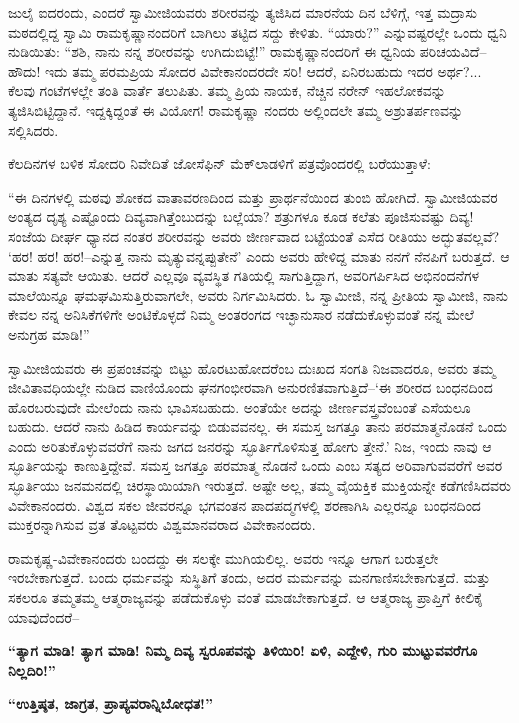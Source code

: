 ಜುಲೈ ಐದರಂದು, ಎಂದರೆ ಸ್ವಾಮೀಜಿಯವರು ಶರೀರವನ್ನು ತ್ಯಜಿಸಿದ ಮಾರನೆಯ ದಿನ ಬೆಳಿಗ್ಗೆ, ಇತ್ತ ಮದ್ರಾಸು ಮಠದಲ್ಲಿದ್ದ ಸ್ವಾಮಿ ರಾಮಕೃಷ್ಣಾನಂದರಿಗೆ ಬಾಗಿಲು ತಟ್ಟಿದ ಸದ್ದು ಕೇಳಿತು. “ಯಾರು?” ಎನ್ನುವಷ್ಟರಲ್ಲೇ ಒಂದು ಧ್ವನಿ ನುಡಿಯಿತು: “ಶಶಿ, ನಾನು ನನ್ನ ಶರೀರವನ್ನು ಉಗಿದುಬಿಟ್ಟೆ!” ರಾಮಕೃಷ್ಣಾನಂದರಿಗೆ ಈ ಧ್ವನಿಯ ಪರಿಚಯವಿದೆ–ಹೌದು! ಇದು ತಮ್ಮ ಪರಮಪ್ರಿಯ ಸೋದರ ವಿವೇಕಾನಂದರದೇ ಸರಿ! ಆದರೆ, ಏನಿರಬಹುದು ಇದರ ಅರ್ಥ?... ಕೆಲವು ಗಂಟೆಗಳಲ್ಲೇ ತಂತಿ ವಾರ್ತೆ ತಲುಪಿತು. ತಮ್ಮ ಪ್ರಿಯ ನಾಯಕ, ನೆಚ್ಚಿನ ನರೇನ್ ಇಹಲೋಕವನ್ನು ತ್ಯಜಿಸಿಬಿಟ್ಟಿದ್ದಾನೆ. ಇದ್ದಕ್ಕಿದ್ದಂತೆ ಈ ವಿಯೋಗ! ರಾಮಕೃಷ್ಣಾ ನಂದರು ಅಲ್ಲಿಂದಲೇ ತಮ್ಮ ಅಶ್ರುತರ್ಪಣವನ್ನು ಸಲ್ಲಿಸಿದರು.

ಕೆಲದಿನಗಳ ಬಳಿಕ ಸೋದರಿ ನಿವೇದಿತೆ ಜೋಸೆಫಿನ್ ಮೆಕ್​ಲಾಡಳಿಗೆ ಪತ್ರವೊಂದರಲ್ಲಿ ಬರೆಯುತ್ತಾಳೆ:

“ಈ ದಿನಗಳಲ್ಲಿ ಮಠವು ಶೋಕದ ವಾತಾವರಣದಿಂದ ಮತ್ತು ಪ್ರಾರ್ಥನೆಯಿಂದ ತುಂಬಿ ಹೋಗಿದೆ. ಸ್ವಾಮೀಜಿಯವರ ಅಂತ್ಯದ ದೃಶ್ಯ ಎಷ್ಟೊಂದು ದಿವ್ಯವಾಗಿತ್ತೆಂಬುದನ್ನು ಬಲ್ಲೆಯಾ? ಶತ್ರುಗಳೂ ಕೂಡ ಕಲೆತು ಪೂಜಿಸುವಷ್ಟು ದಿವ್ಯ! ಸಂಜೆಯ ದೀರ್ಘ ಧ್ಯಾನದ ನಂತರ ಶರೀರವನ್ನು ಅವರು ಜೀರ್ಣವಾದ ಬಟ್ಟೆಯಂತೆ ಎಸೆದ ರೀತಿಯು ಅದ್ಭುತವಲ್ಲವೆ? ‘ಹರ! ಹರ! ಹರ!–ಎನ್ನುತ್ತ ನಾನು ಮೃತ್ಯುವನ್ನಪ್ಪುತೇನೆ’ ಎಂದು ಅವರು ಹೇಳಿದ್ದ ಮಾತು ನನಗೆ ನೆನಪಿಗೆ ಬರುತ್ತದೆ. ಆ ಮಾತು ಸತ್ಯವೇ ಆಯಿತು. ಆದರೆ ಎಲ್ಲವೂ ವ್ಯವಸ್ಥಿತ ಗತಿಯಲ್ಲಿ ಸಾಗುತ್ತಿದ್ದಾಗ, ಅವರಿಗರ್ಪಿಸಿದ ಅಭಿನಂದನೆಗಳ ಮಾಲೆಯಿನ್ನೂ ಘಮಘಮಿಸುತ್ತಿರುವಾಗಲೇ, ಅವರು ನಿರ್ಗಮಿಸಿದರು. ಓ ಸ್ವಾಮೀಜಿ, ನನ್ನ ಪ್ರೀತಿಯ ಸ್ವಾಮೀಜಿ, ನಾನು ಕೇವಲ ನನ್ನ ಅನಿಸಿಕೆಗಳಿಗೇ ಅಂಟಿಕೊಳ್ಳದೆ ನಿಮ್ಮ ಅಂತರಂಗದ ಇಚ್ಛಾನುಸಾರ ನಡೆದುಕೊಳ್ಳುವಂತೆ ನನ್ನ ಮೇಲೆ ಅನುಗ್ರಹ ಮಾಡಿ!”

ಸ್ವಾಮೀಜಿಯವರು ಈ ಪ್ರಪಂಚವನ್ನು ಬಿಟ್ಟು ಹೊರಟುಹೋದರೆಂಬ ದುಃಖದ ಸಂಗತಿ ನಿಜವಾದರೂ, ಅವರು ತಮ್ಮ ಜೀವಿತಾವಧಿಯಲ್ಲೇ ನುಡಿದ ವಾಣಿಯೊಂದು ಘನಗಂಭೀರವಾಗಿ ಅನುರಣಿತವಾಗುತ್ತಿದೆ–‘ಈ ಶರೀರದ ಬಂಧನದಿಂದ ಹೊರಬರುವುದೇ ಮೇಲೆಂದು ನಾನು ಭಾವಿಸಬಹುದು. ಅಂತೆಯೇ ಅದನ್ನು ಜೀರ್ಣವಸ್ತ್ರವೆಂಬಂತೆ ಎಸೆಯಲೂ ಬಹುದು. ಆದರೆ ನಾನು ಹಿಡಿದ ಕಾರ್ಯವನ್ನು ಬಿಡುವವನಲ್ಲ. ಈ ಸಮಸ್ತ ಜಗತ್ತೂ ತಾನು ಪರಮಾತ್ಮನೊಡನೆ ಒಂದು ಎಂದು ಅರಿತುಕೊಳ್ಳುವವರೆಗೆ ನಾನು ಜಗದ ಜನರನ್ನು ಸ್ಫೂರ್ತಿಗೊಳಿಸುತ್ತ ಹೋಗು ತ್ತೇನೆ.’ ನಿಜ, ಇಂದು ನಾವು ಆ ಸ್ಫೂರ್ತಿಯನ್ನು ಕಾಣುತ್ತಿದ್ದೇವೆ. ಸಮಸ್ತ ಜಗತ್ತೂ ಪರಮಾತ್ಮ ನೊಡನೆ ಒಂದು ಎಂಬ ಸತ್ಯದ ಅರಿವಾಗುವವರೆಗೆ ಅವರ ಸ್ಫೂರ್ತಿಯು ಜನಮನದಲ್ಲಿ ಚಿರಸ್ಥಾಯಿಯಾಗಿ ಇರುತ್ತದೆ. ಅಷ್ಟೇ ಅಲ್ಲ, ತಮ್ಮ ವೈಯಕ್ತಿಕ ಮುಕ್ತಿಯನ್ನೇ ಕಡೆಗಣಿಸಿದವರು ವಿವೇಕಾನಂದರು. ವಿಶ್ವದ ಸಕಲ ಜೀವರನ್ನೂ ಭಗವಂತನ ಪಾದಪದ್ಮಗಳಲ್ಲಿ ಶರಣಾಗಿಸಿ ಎಲ್ಲರನ್ನೂ ಬಂಧನದಿಂದ ಮುಕ್ತರನ್ನಾಗಿಸುವ ವ್ರತ ತೊಟ್ಟವರು ವಿಶ್ವಮಾನವರಾದ ವಿವೇಕಾನಂದರು.

ರಾಮಕೃಷ್ಣ-ವಿವೇಕಾನಂದರು ಬಂದದ್ದು ಈ ಸಲಕ್ಕೇ ಮುಗಿಯಲಿಲ್ಲ. ಅವರು ಇನ್ನೂ ಆಗಾಗ ಬರುತ್ತಲೇ ಇರಬೇಕಾಗುತ್ತದೆ. ಬಂದು ಧರ್ಮವನ್ನು ಸುಸ್ಥಿತಿಗೆ ತಂದು, ಅದರ ಮರ್ಮವನ್ನು ಮನಗಾಣಿಸಬೇಕಾಗುತ್ತದೆ. ಮತ್ತು ಸಕಲರೂ ತಮ್ಮತಮ್ಮ ಆತ್ಮರಾಜ್ಯವನ್ನು ಪಡೆದುಕೊಳ್ಳು ವಂತೆ ಮಾಡಬೇಕಾಗುತ್ತದೆ. ಆ ಆತ್ಮರಾಜ್ಯ ಪ್ರಾಪ್ತಿಗೆ ಕೀಲಿಕೈ ಯಾವುದೆಂದರೆ–

\textbf{“ತ್ಯಾಗ ಮಾಡಿ! ತ್ಯಾಗ ಮಾಡಿ! ನಿಮ್ಮ ದಿವ್ಯ ಸ್ವರೂಪವನ್ನು ತಿಳಿಯಿರಿ! ಏಳಿ, ಎದ್ದೇಳಿ, ಗುರಿ ಮುಟ್ಟುವವರೆಗೂ ನಿಲ್ಲದಿರಿ!”}

\textbf{“ಉತ್ತಿಷ್ಠತ, ಜಾಗ್ರತ, ಪ್ರಾಪ್ಯವರಾನ್ನಿಬೋಧತ!”}

